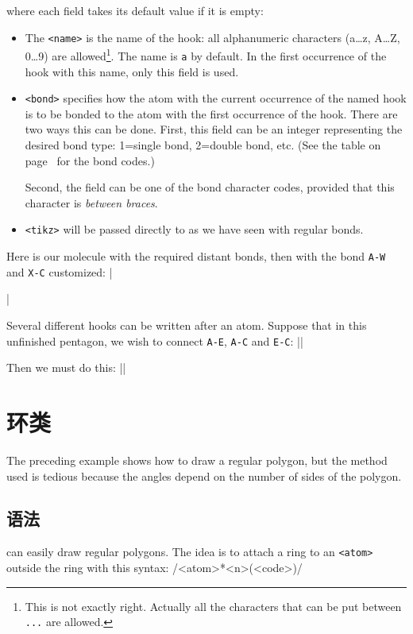 \documentclass[10pt]{article}
\begin{document}
where each field takes its default value if it is empty:
\begin{itemize}
	\item The \verb-<name>- is the name of the hook: all alphanumeric characters (a\dots z, A\dots Z, 0\dots 9) are allowed\footnote{This is not exactly right. Actually all the characters that can be put between \texttt{\string\csname...\string\endcsname} are allowed.}. The name is \verb-a- by default. In the first occurrence of the hook with this name, only this field is used.
	\item \verb-<bond>- specifies how the atom with the current occurrence of the named hook is to be bonded to the atom with the first occurrence of the hook. There are two ways this can be done. First, this field can be an integer representing the desired bond type: 1=single bond, 2=double bond, etc. (See the table on page~\pageref{types.liaisons} for the bond codes.)

		Second, the field can be one of the bond character codes, provided that this character is \emph{between braces}.
	\item \verb-<tikz>- will be passed directly to \TIKZ as we have seen with regular bonds.
\end{itemize}

Here is our molecule with the required distant bonds, then with the bond \verb/A-W/ and \verb/X-C/ customized:
|\par\medskip
	|

Several different hooks can be written after an atom. Suppose that in this unfinished pentagon, we wish to connect \verb/A-E/, \verb/A-C/ and \verb/E-C/:
||

Then we must do this:
||

\section{环类}
The preceding example shows how to draw a regular polygon, but the method used is tedious because the angles depend on the number of sides of the polygon.

\subsection{语法}
\CF can easily draw regular polygons. The idea is to attach a ring to an \verb/<atom>/ outside the ring with this syntax:
\centerverb/<atom>*<n>(<code>)/
\smallskip
\end{document}
